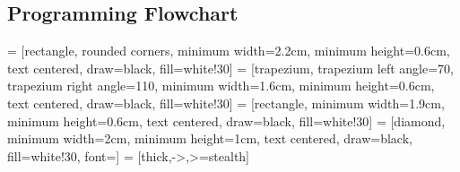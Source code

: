 \documentclass[conference, onecolumn]{IEEEtran}
\begin{document}
\subsection{Programming Flowchart}
\thispagestyle{empty}

 = [rectangle, rounded corners, minimum width=2.2cm, minimum height=0.6cm, text centered, draw=black, fill=white!30]
 = [trapezium, trapezium left angle=70, trapezium right angle=110, minimum width=1.6cm, minimum height=0.6cm, text centered, draw=black, fill=white!30]
 = [rectangle, minimum width=1.9cm, minimum height=0.6cm, text centered, draw=black, fill=white!30]
 = [diamond, minimum width=2cm, minimum height=1cm, text centered, draw=black, fill=white!30, font=\normalsize]
 = [thick,->,>=stealth]
\end{document}
